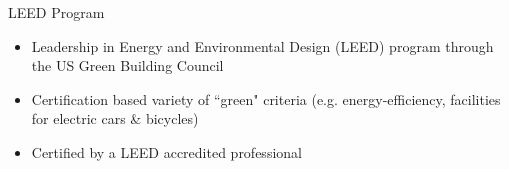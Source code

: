 \documentclass[11pt]{beamer}
\begin{document}
\begin{frame}{LEED Program}

\begin{itemize}
	\item Leadership in Energy and Environmental Design (LEED) program through the US Green Building Council
	\vfill
	
	\item Certification based  variety of ``green" criteria (e.g. energy-efficiency, facilities for electric cars \& bicycles)  
	\vfill

	\item Certified by a LEED accredited professional
\end{itemize}


\end{frame}

\end{document}
